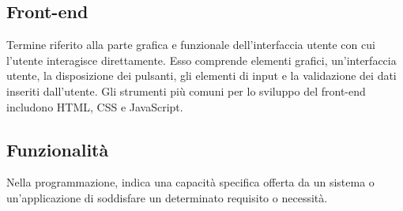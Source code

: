\hypertarget{sec:front-end}{}
\subsection*{Front-end}
Termine riferito alla parte grafica e funzionale dell’interfaccia utente con cui l’utente interagisce direttamente. 
Esso comprende elementi grafici, un’interfaccia utente, la disposizione dei pulsanti, gli elementi di input e la 
validazione dei dati inseriti dall’utente. Gli strumenti più comuni per lo sviluppo del front-end includono HTML, 
CSS e JavaScript.

\hypertarget{sec:funzionalità}{}
\subsection*{Funzionalità}
Nella programmazione, indica una capacità specifica offerta da un sistema o un'applicazione di soddisfare un determinato requisito o necessità.

\newpage